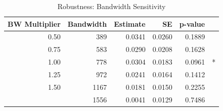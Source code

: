 \begin{table}[!h]
\centering
\caption{\label{tab:bandwidth}Robustness: Bandwidth Sensitivity}
\centering
\begin{tabular}[t]{rrrrrl}
\toprule
BW Multiplier & Bandwidth & Estimate & SE & p-value & \\
\midrule
0.50 & 389 & 0.0341 & 0.0260 & 0.1889 & \\
0.75 & 583 & 0.0290 & 0.0208 & 0.1628 & \\
1.00 & 778 & 0.0304 & 0.0183 & 0.0961 & *\\
1.25 & 972 & 0.0241 & 0.0164 & 0.1412 & \\
1.50 & 1167 & 0.0181 & 0.0150 & 0.2255 & \\
\addlinespace
2.00 & 1556 & 0.0041 & 0.0129 & 0.7486 & \\
\bottomrule
\end{tabular}
\end{table}
